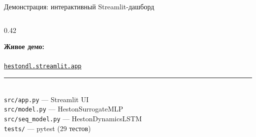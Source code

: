 \documentclass[aspectratio=169, 10pt]{beamer}
\begin{document}
\begin{frame}{Демонстрация: интерактивный Streamlit-дашборд}
\begin{columns}[T]
    \begin{column}{0.42\textwidth}
      \begin{center}
        \textbf{Живое демо:}\\[0.3em]
        \\[0.25em]
        {\small\color{hestonblue}
          \href{https://hestondl.streamlit.app/}%
               {\texttt{hestondl.streamlit.app}}}\\[0.4em]
        {\color{hestonblue}\rule{0.8\linewidth}{0.4pt}}\\[0.3em]
        {\tiny
          \texttt{src/app.py} --- Streamlit UI\\[0.12em]
          \texttt{src/model.py} --- HestonSurrogateMLP\\[0.12em]
          \texttt{src/seq\_model.py} --- HestonDynamicsLSTM\\[0.12em]
          \texttt{tests/} --- pytest (29 тестов)}
      \end{center}
    \end{column}

  \end{columns}
\end{frame}
\end{document}
